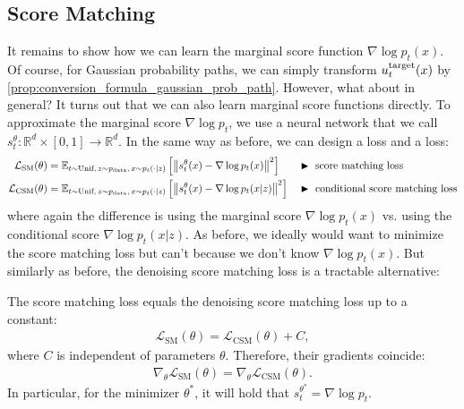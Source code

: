 \subsection{Score Matching}
\label{subsec:score_matching}
It remains to show how we can learn the marginal score function $\nabla\log p_t(x)$. Of course, for Gaussian probability paths, we can simply transform $u^{\text{target}}_t(x)$ by \cref{prop:conversion_formula_gaussian_prob_path}. However, what about in general? It turns out that we can also learn marginal score functions directly. To approximate the marginal score $\nabla\log p_t$, we use a neural network that we call  $s_t^\theta:\mathbb{R}^d\times[0,1]\to\mathbb{R}^d$. In the same way as before, we can design a  loss and a  loss:
\begin{align*}
    \mathcal{L}_{\text{SM}}(\theta) &=\mathbb{E}_{t\sim\text{Unif},\,z\sim p_{\rm{data}},\, x\sim p_t(\cdot|z)}\left[\left\|s_t^\theta(x) - \nabla\log p_t(x)\right\|^2\right] &&\blacktriangleright\,\,\text{score matching loss}\\
    \mathcal{L}_{\text{CSM}}(\theta) &=\mathbb{E}_{t\sim\text{Unif},\,z\sim p_{\rm{data}},\, x\sim p_t(\cdot|z)}\left[\left\|s_t^\theta(x) - \nabla\log p_t(x|z)\right\|^2\right]  &&\blacktriangleright\,\,\text{conditional score matching loss}
\end{align*}
where again the difference is using the marginal score $\nabla\log p_t(x)$ vs. using the conditional score $\nabla\log p_t(x|z)$. %
As before, we ideally would want to minimize the score matching loss but can't because we don't know $\nabla\log p_t(x)$. But similarly as before, the denoising score matching loss is a tractable alternative:
\begin{theorem}
\label{thm:dsm_loss}
The score matching loss equals the denoising score matching loss up to a constant:
\begin{align*}
\mathcal{L}_{\text{SM}}(\theta) = \mathcal{L}_{\text{CSM}}(\theta) + C,
\end{align*}
where $C$ is independent of parameters $\theta$. Therefore, their gradients coincide:
\begin{align*}
\nabla_\theta \mathcal{L}_{\text{SM}}(\theta) = \nabla_\theta \mathcal{L}_{\text{CSM}}(\theta).
\end{align*}
In particular, for the minimizer $\theta^*$, it will hold that $s_t^{\theta^*}=\nabla\log p_t$. 
\end{theorem}
